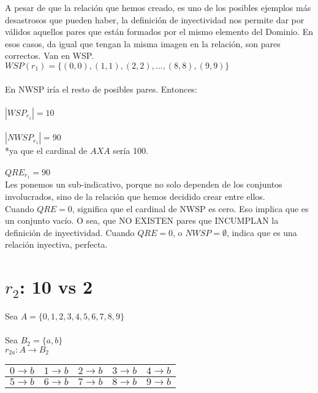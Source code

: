 	\noindent
	A pesar de que la relación que hemos creado, es uno de los posibles ejemplos más desastrosos que pueden haber, la definición de inyectividad nos permite dar por válidos aquellos pares que están formados por el mismo elemento del Dominio. En esos casos, da igual que tengan la misma imagen en la relación, son pares correctos. Van en WSP.
	\\
	
	\noindent
	$WSP(r_{1}) = \{(0,0), (1,1), (2,2), ..., (8,8), (9,9)\}$\\\\
	En NWSP iría el resto de posibles pares. Entonces:\\\\
	$|WSP_{r_{1}}| = 10$\\\\
	$|NWSP_{r_{1}}| = 90$\\
	*ya que el cardinal de $A X A$ sería 100.\\\\
	$QRE_{r_{1}} = 90$
	\\
	
	\noindent
	Les ponemos un sub-indicativo, porque no solo dependen de los conjuntos involucrados, sino de la relación que hemos decidido crear entre ellos.
	\\
	
	\noindent
	Cuando $QRE=0$, significa que el cardinal de NWSP es cero. Eso implica que es un conjunto vacío. O sea, que NO EXISTEN pares que INCUMPLAN la definición de inyectividad. Cuando $QRE=0$, o $NWSP=\emptyset$, indica que es una relación inyectiva, perfecta.
	\\
	
	\newpage
	\section{$r_{2}$: 10 vs 2}
	
	\noindent
	Sea $A=\{0,1,2,3,4,5,6,7,8,9\}$\\\\
	Sea $B_{2} = \{a,b\}$
	\\
	
	\noindent
	$r_{2a}:A \longrightarrow B_{2}$
	\begin{table}[h!]
		\begin{tabular}{|c|c|c|c|c|}
			\hline
			$0 \longrightarrow b$ & $1 \longrightarrow b$ & $2 \longrightarrow b$ & $3 \longrightarrow b$ & $4 \longrightarrow b$ \\ 
			\hline
			$5 \longrightarrow b$ & $6 \longrightarrow b$ & $7 \longrightarrow b$ & $8 \longrightarrow b$ & $9 \longrightarrow b$ \\  
			\hline
		\end{tabular}
	\end{table}
	
